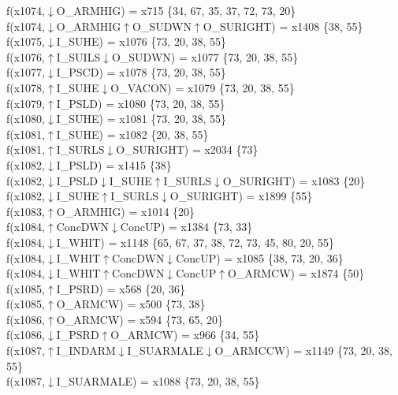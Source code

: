 f(x1074,$\downarrow$O\_ARMHIG) = x715 \{34, 67, 35, 37, 72, 73, 20\} \\  
f(x1074,$\downarrow$O\_ARMHIG$\uparrow$O\_SUDWN$\uparrow$O\_SURIGHT) = x1408 \{38, 55\} \\  
f(x1075,$\downarrow$I\_SUHE) = x1076 \{73, 20, 38, 55\} \\  
f(x1076,$\uparrow$I\_SUILS$\downarrow$O\_SUDWN) = x1077 \{73, 20, 38, 55\} \\  
f(x1077,$\downarrow$I\_PSCD) = x1078 \{73, 20, 38, 55\} \\  
f(x1078,$\uparrow$I\_SUHE$\downarrow$O\_VACON) = x1079 \{73, 20, 38, 55\} \\  
f(x1079,$\uparrow$I\_PSLD) = x1080 \{73, 20, 38, 55\} \\  
f(x1080,$\downarrow$I\_SUHE) = x1081 \{73, 20, 38, 55\} \\  
f(x1081,$\uparrow$I\_SUHE) = x1082 \{20, 38, 55\} \\  
f(x1081,$\uparrow$I\_SURLS$\downarrow$O\_SURIGHT) = x2034 \{73\} \\  
f(x1082,$\downarrow$I\_PSLD) = x1415 \{38\} \\  
f(x1082,$\downarrow$I\_PSLD$\downarrow$I\_SUHE$\uparrow$I\_SURLS$\downarrow$O\_SURIGHT) = x1083 \{20\} \\  
f(x1082,$\downarrow$I\_SUHE$\uparrow$I\_SURLS$\downarrow$O\_SURIGHT) = x1899 \{55\} \\  
f(x1083,$\uparrow$O\_ARMHIG) = x1014 \{20\} \\  
f(x1084,$\uparrow$ConcDWN$\downarrow$ConcUP) = x1384 \{73, 33\} \\  
f(x1084,$\downarrow$I\_WHIT) = x1148 \{65, 67, 37, 38, 72, 73, 45, 80, 20, 55\} \\  
f(x1084,$\downarrow$I\_WHIT$\uparrow$ConcDWN$\downarrow$ConcUP) = x1085 \{38, 73, 20, 36\} \\  
f(x1084,$\downarrow$I\_WHIT$\uparrow$ConcDWN$\downarrow$ConcUP$\uparrow$O\_ARMCW) = x1874 \{50\} \\  
f(x1085,$\uparrow$I\_PSRD) = x568 \{20, 36\} \\  
f(x1085,$\uparrow$O\_ARMCW) = x500 \{73, 38\} \\  
f(x1086,$\uparrow$O\_ARMCW) = x594 \{73, 65, 20\} \\  
f(x1086,$\downarrow$I\_PSRD$\uparrow$O\_ARMCW) = x966 \{34, 55\} \\  
f(x1087,$\uparrow$I\_INDARM$\downarrow$I\_SUARMALE$\downarrow$O\_ARMCCW) = x1149 \{73, 20, 38, 55\} \\  
f(x1087,$\downarrow$I\_SUARMALE) = x1088 \{73, 20, 38, 55\} \\  

